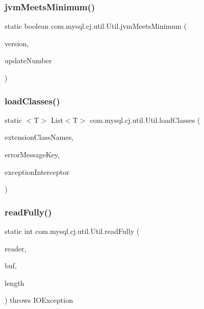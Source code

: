\subsubsection{\texorpdfstring{jvm\+Meets\+Minimum()}{jvmMeetsMinimum()}}
{\footnotesize\ttfamily static boolean com.\+mysql.\+cj.\+util.\+Util.\+jvm\+Meets\+Minimum (\begin{DoxyParamCaption}\item[{int}]{version,  }\item[{int}]{update\+Number }\end{DoxyParamCaption})\hspace{0.3cm}{\ttfamily [static]}}

\mbox{\label{classcom_1_1mysql_1_1cj_1_1util_1_1_util_a1934cc15d2aae4985ce372a84e920eb7}} 
\subsubsection{\texorpdfstring{load\+Classes()}{loadClasses()}}
{\footnotesize\ttfamily static $<$T$>$ List$<$T$>$ com.\+mysql.\+cj.\+util.\+Util.\+load\+Classes (\begin{DoxyParamCaption}\item[{String}]{extension\+Class\+Names,  }\item[{String}]{error\+Message\+Key,  }\item[{\mbox{\hyperlink{interfacecom_1_1mysql_1_1cj_1_1exceptions_1_1_exception_interceptor}{Exception\+Interceptor}}}]{exception\+Interceptor }\end{DoxyParamCaption})\hspace{0.3cm}{\ttfamily [static]}}

\mbox{\label{classcom_1_1mysql_1_1cj_1_1util_1_1_util_afdf93512d8a6651e10b26d2f6f5613b2}} 
\subsubsection{\texorpdfstring{read\+Fully()}{readFully()}}
{\footnotesize\ttfamily static int com.\+mysql.\+cj.\+util.\+Util.\+read\+Fully (\begin{DoxyParamCaption}\item[{Reader}]{reader,  }\item[{char \mbox{[}$\,$\mbox{]}}]{buf,  }\item[{int}]{length }\end{DoxyParamCaption}) throws I\+O\+Exception\hspace{0.3cm}{\ttfamily [static]}}


